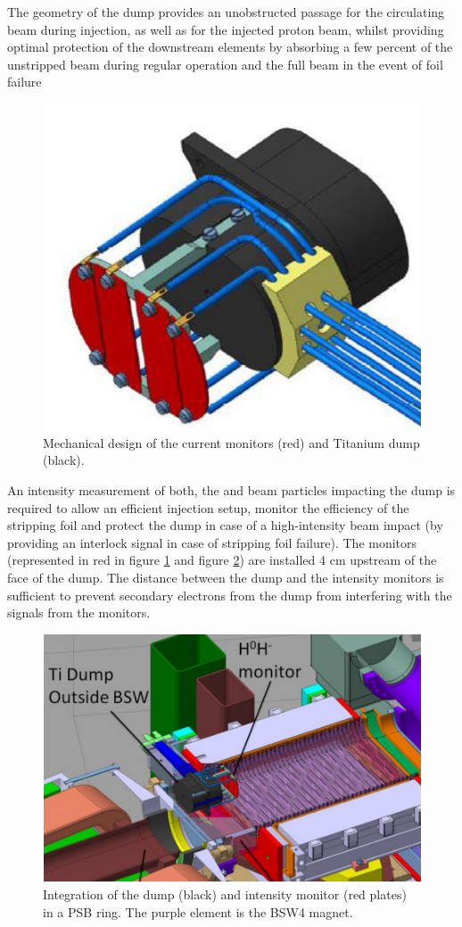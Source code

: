 The geometry of the dump provides an unobstructed passage for the circulating beam during injection, as well as for the injected proton beam, whilst providing optimal protection of the downstream elements by absorbing a few percent of the unstripped beam during regular operation and the full beam in the event of foil failure

\begin{figure}[h]
    \centering
    \includegraphics[width=0.45\columnwidth]{Figure_H0H-Monitpor/H0H-.png}
    \caption{Mechanical design of the \hzhm current monitors (red) and Titanium dump (black).}
    \label{fig:H0H-dump}
\end{figure}

An intensity measurement of both, the \hzz and \hm beam particles impacting the dump is required to allow an efficient injection setup, monitor the efficiency of the stripping foil and protect the dump in case of a high-intensity beam impact (by providing an interlock signal in case of stripping foil failure). The \hzhm monitors (represented in red in figure \ref{fig:H0H-dump} and figure \ref{fig:H0H-Loc}) are installed 4 cm upstream of the face of the dump. The distance between the dump and the intensity monitors is sufficient to prevent secondary electrons from the dump from interfering with the signals from the monitors.

\begin{figure}[h]
    \centering
    \includegraphics[width=0.6\columnwidth]{Figure_H0H-Monitpor/Instalation.png}
    \caption{Integration of the \hzhm dump (black) and intensity monitor (red plates) in a PSB ring. The purple element is the BSW4 magnet.}
    \label{fig:H0H-Loc}
\end{figure}

